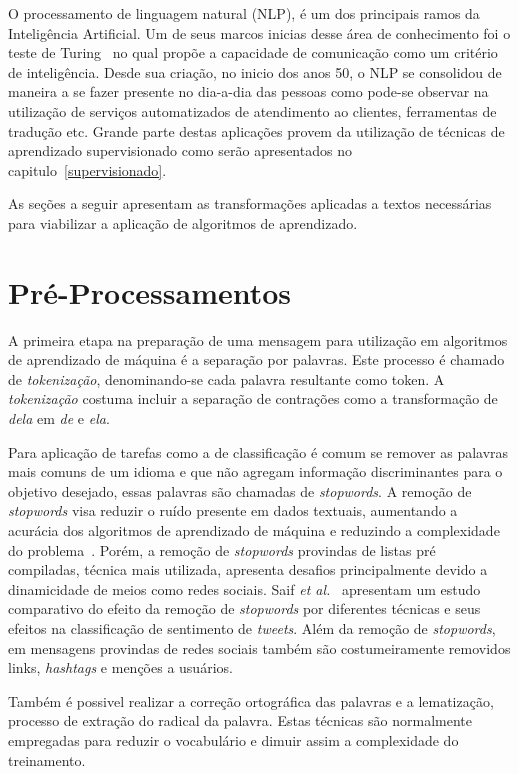 O processamento de linguagem natural (NLP), é um dos principais ramos da Inteligência Artificial.
Um de seus marcos inicias desse área de conhecimento foi o teste de Turing~\cite{turing50} no qual propõe a capacidade
de comunicação como um critério de inteligência.
Desde sua criação, no inicio dos anos 50, o NLP se consolidou de maneira a se fazer presente no dia-a-dia das pessoas
como pode-se observar na utilização de serviços automatizados de atendimento ao clientes, ferramentas de tradução etc.
Grande parte destas aplicações provem da utilização de técnicas de aprendizado supervisionado como serão apresentados
no capitulo~\ref{supervisionado}.

As seções a seguir apresentam as transformações aplicadas a textos necessárias para viabilizar a aplicação de algoritmos
de aprendizado.

\section{Pré-Processamentos}

A primeira etapa na preparação de uma mensagem para utilização em algoritmos de aprendizado de máquina é a separação por
palavras.
Este processo é chamado de \textit{tokenização}, denominando-se cada palavra resultante como token.
A \textit{tokenização} costuma incluir a separação de contrações como a transformação de \textit{dela} em \textit{de}
e \textit{ela}.


Para aplicação de tarefas como a de classificação é comum se remover as palavras mais comuns de um idioma e que não
agregam informação discriminantes para o objetivo desejado, essas palavras são chamadas de \textit{stopwords}.
A remoção de \textit{stopwords} visa reduzir o ruído presente em dados textuais, aumentando a acurácia dos algoritmos de
aprendizado de máquina e reduzindo a complexidade do problema~\cite{silva03}.
Porém, a remoção de \textit{stopwords} provindas de listas pré compiladas, técnica mais utilizada, apresenta desafios
principalmente devido a dinamicidade de meios como redes sociais.
Saif \textit{et al.}~\cite{saif14} apresentam um estudo comparativo do efeito da remoção de \textit{stopwords} por
diferentes técnicas e seus efeitos na classificação de sentimento de \textit{tweets}.
Além da remoção de \textit{stopwords}, em mensagens provindas de redes sociais também são costumeiramente removidos
links, \textit{hashtags} e menções a usuários.

Também é possivel realizar a correção ortográfica das palavras e a lematização, processo de extração do radical da
palavra.
Estas técnicas são normalmente empregadas para reduzir o vocabulário e dimuir assim a complexidade do treinamento.

